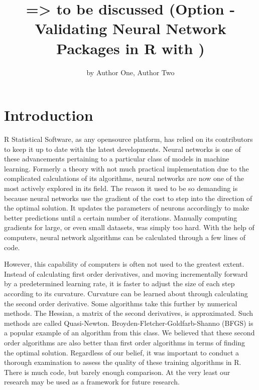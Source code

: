 \title{=\textgreater{} to be discussed (Option - Validating Neural Network
Packages in R with )}
\author{by Author One, Author Two}

\maketitle



\hypertarget{introduction}{%
\section{Introduction}\label{introduction}}

R Statistical Software, as any opensource platform, has relied on its
contributors to keep it up to date with the latest developments. Neural
networks is one of these advancements pertaining to a particular class
of models in machine learning. Formerly a theory with not much practical
implementation due to the complicated calculations of its algorithms,
neural networks are now one of the most actively explored in its field.
The reason it used to be so demanding is because neural networks use the
gradient of the cost to step into the direction of the optimal solution.
It updates the parameters of neurons accordingly to make better
predictions until a certain number of iterations. Manually computing
gradients for large, or even small datasets, was simply too hard. With
the help of computers, neural network algorithms can be calculated
through a few lines of code.

However, this capability of computers is often not used to the greatest
extent. Instead of calculating first order derivatives, and moving
incrementally forward by a predetermined learning rate, it is faster to
adjust the size of each step according to its curvature. Curvature can
be learned about through calculating the second order derivative. Some
algorithms take this further by numerical methods. The Hessian, a matrix
of the second derivatives, is approximated. Such methods are called
Quasi-Newton. Broyden-Fletcher-Goldfarb-Shanno (BFGS) is a popular
example of an algorithm from this class. We believed that these second
order algorithms are also better than first order algorithms in terms of
finding the optimal solution. Regardless of our belief, it was important
to conduct a thorough examination to assess the quality of these
training algorithms in R. There is much code, but barely enough
comparison. At the very least our research may be used as a framework
for future research.

